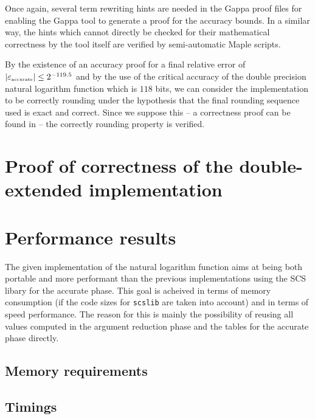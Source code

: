 Once again, several term rewriting hints are needed in the Gappa proof files for enabling the Gappa tool to 
generate a proof for the accuracy bounds. In a similar way, the hints which cannot directly be checked for their 
mathematical correctness by the tool itself are verified by semi-automatic Maple scripts.\par
By the existence of an accuracy proof for a final relative error of $\left \vert \epsilon_{\mbox{\tiny accurate}} \right \vert \leq 2^{-119.5}$ and
by the use of the critical accuracy of the double precision natural logarithm function which is 
$118$ bits\cite{DinDefLau2004LIP}, we can consider the implementation to be correctly rounding under the hypothesis
that the final rounding sequence used is exact and correct. Since we suppose this -- a correctness proof can be 
found in \cite{Lauter2005LIP:tripledouble} -- the correctly rounding property is verified.


\section{Proof of correctness of the double-extended implementation \label{sec:logdeproof}}


\section{Performance results\label{sec:logperf}}
The given implementation of the natural logarithm function aims at
being both portable and more performant than the previous
implementations using the SCS libary for the accurate phase.  This
goal is acheived in terms of memory consumption (if the code sizes for
{\tt scslib} are taken into account) and in terms of speed
performance. The reason for this is mainly the possibility of reusing
all values computed in the argument reduction phase and the tables for
the accurate phase directly.

\subsection{Memory requirements}



\subsection{Timings}


